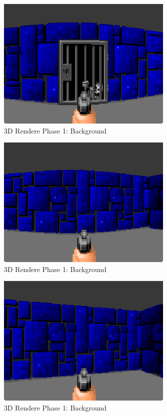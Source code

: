 \documentclass[book.tex]{subfiles}
\begin{document}
 \begin{figure}[H]
\centering
 \includegraphics[scale=1.3]{imgs/fish_eye/bad_bad.png}
 \caption{3D Rendere Phase 1: Background} \label{fig:mips}
 \end{figure}






 \begin{figure}[H]
\centering
 \includegraphics[scale=1.3]{imgs/fish_eye/fish_eye.png}
 \caption{3D Rendere Phase 1: Background} \label{fig:mips}
 \end{figure}
 
 
  \begin{figure}[H]
\centering
 \includegraphics[scale=1.3]{imgs/fish_eye/fish_eye_corrected.png}
 \caption{3D Rendere Phase 1: Background} \label{fig:mips}
 \end{figure}
 
\end{document}
